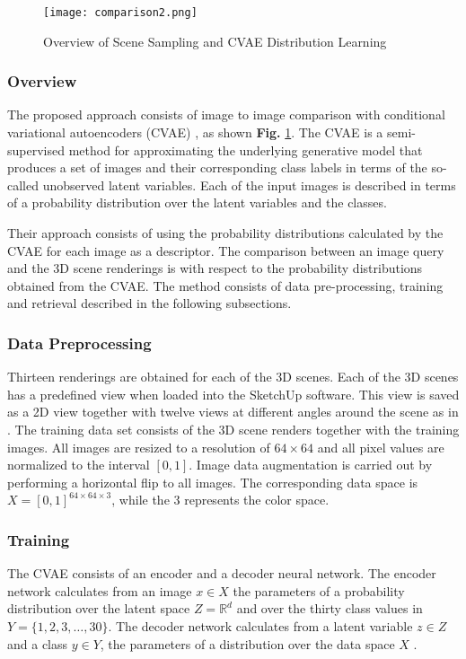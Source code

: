 \documentclass[../main.tex]{subfiles}
\begin{document}
\begin{figure}[htb]
	\centering
	\texttt{[image: comparison2.png]}
	\caption{\label{fig:cvae} Overview of Scene Sampling and CVAE Distribution 
	Learning}
\end{figure}

\subsubsection{Overview}
The proposed approach consists of image to image comparison with conditional 
variational autoencoders (CVAE) \cite{kingma2014semi}, as shown \textbf{Fig.} 
\ref{fig:cvae}. The CVAE is a semi-supervised method for approximating the 
underlying generative model that produces a set of images and their 
corresponding class labels in terms of the so-called unobserved latent 
variables. Each of the input images is described in terms of a probability 
distribution over the latent variables and the classes. 

Their approach consists of using the probability distributions calculated by 
the CVAE for each image as a descriptor. The comparison between an image query 
and the 3D scene renderings is with respect to the probability distributions 
obtained from the CVAE. The method consists of data pre-processing, training 
and retrieval described in the following subsections.

\subsubsection{Data Preprocessing}
Thirteen renderings are obtained for each of the 3D scenes. Each of the 3D 
scenes has a predefined view when loaded into the SketchUp software. This view 
is saved as a 2D view together with twelve views at different angles around the 
scene as in \cite{Su2015}.
The training data set consists of the 3D scene renders together with the 
training images. All images are resized to a resolution of $64\times64$ and all 
pixel values are normalized to the interval $[0,1]$. Image data augmentation is 
carried out by performing a horizontal flip to all images. The corresponding 
data space is $X = [0,1]^{64\times 64 \times 3}$, while the 3 represents the 
color space. 

\subsubsection{Training}
The CVAE consists of an encoder and a decoder neural network. The encoder network calculates from an image $x\in X$ the parameters of a probability distribution over the latent space $Z = \mathbb{R}^d$ and over the thirty class values in $Y = \{1,2,3,\ldots, 30\}$. The decoder network calculates from a latent variable $z\in Z$ and a class $y\in Y$, the parameters of a distribution over the data space $X$ .
\end{document}
